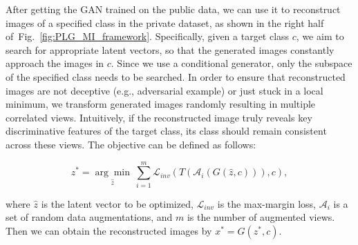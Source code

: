 \documentclass[letterpaper]{article} %
\newcommand{\Fref}[1]{Fig.~\ref{#1}}
\begin{document}
After getting the GAN trained on the public data, we can use it to reconstruct images of a specified class in the private dataset, as shown in the right half of~\Fref{fig:PLG_MI_framework}. Specifically, given a target class $c$, we aim to search for appropriate latent vectors, so that the generated images constantly approach the images in $c$. Since we use a conditional generator, only the subspace of the specified class needs to be searched. In order to ensure that reconstructed images are not deceptive (e.g., adversarial example) or just stuck in a local minimum, we transform generated images randomly resulting in multiple correlated views. Intuitively, if the reconstructed image truly reveals key discriminative features of the target class, its class should remain consistent across these views. The objective can be defined as follows:
\begin{linenomath*}
\begin{equation}\label{eq:Rec_Loss}
z^{*} = \underset{\hat{z}}{\arg \min}\  \sum_{i=1}^{m} \mathcal{L}_{inv}(T( \mathcal{A}_{i}(G(\hat{z}, c))),c),
\end{equation}
\end{linenomath*}
where $\hat{z}$ is the latent vector to be optimized, $\mathcal{L}_{inv}$ is the max-margin loss, $\mathcal{A}_{i}$ is a set of random data augmentations, and $m$ is the number of augmented views. Then we can obtain the reconstructed images by $x^{*} = G(z^{*},c)$.
\end{document}
